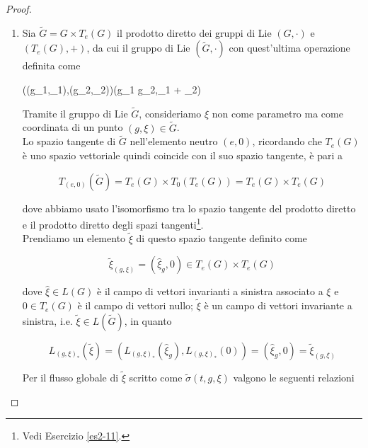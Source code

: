 \begin{proof}\hfill\break
	\begin{enumerate}
		\item Sia $ \tilde{G} = G \times T_{e}(G) $ il prodotto diretto dei gruppi di Lie $ (G,\cdot) $ e $ (T_{e}(G),+) $, da cui il gruppo di Lie $ (\tilde{G},\cdot) $ con quest'ultima operazione definita come
		
		\map{\cdot}
			{\tilde{G} \times {}}{}
			{((g_{1},\xi_{1}),(g_{2},\xi_{2}))}{(g_{1} \cdot g_{2},\xi_{1} + \xi_{2})}

		Tramite il gruppo di Lie $  $, consideriamo $ \xi $ non come parametro ma come coordinata di un punto $ (g,\xi) \in \tilde{G} $.\\
		Lo spazio tangente di $ \tilde{G} $ nell'elemento neutro $ (e,0) $, ricordando che $ T_{e}(G) $ è uno spazio vettoriale quindi coincide con il suo spazio tangente, è pari a
		
		\begin{equation}
			T_{(e,0)}(\tilde{G}) = T_{e}(G) \times T_{0}(T_{e}(G)) %
			= T_{e}(G) \times T_{e}(G)
		\end{equation}
		
		dove abbiamo usato l'isomorfismo tra lo spazio tangente del prodotto diretto e il prodotto diretto degli spazi tangenti\footnote{%
			Vedi Esercizio \ref{es2-11}.%
		}.\\
		Prendiamo un elemento $ \tilde{\xi} $ di questo spazio tangente definito come
		
		\begin{equation}
			\tilde{\xi}_{(g,\xi)} = (\hat{\xi}_{g},0) \in T_{e}(G) \times T_{e}(G)
		\end{equation}
	
		dove $ \hat{\xi} \in L(G) $ è il campo di vettori invarianti a sinistra associato a $ \xi $ e $ 0 \in T_{e}(G) $ è il campo di vettori nullo; $ \tilde{\xi} $ è un campo di vettori invariante a sinistra, i.e. $ \tilde{\xi} \in L(\tilde{G}) $, in quanto
		
		\begin{equation}
			L_{(g,\xi)_{*}} \left( \tilde{\xi} \right) = \left( L_{(g,\xi)_{*}} \left( \hat{\xi}_{g} \right), L_{(g,\xi)_{*}} (0) \right) %
			= \left( \hat{\xi}_{g},0 \right) %
			= \tilde{\xi}_{(g,\xi)}
		\end{equation}
	
		Per il flusso globale di $ \tilde{\xi} $ scritto come $ \tilde{\sigma}(t,g,\xi) $ valgono le seguenti relazioni
		

\end{enumerate}
\end{proof}
